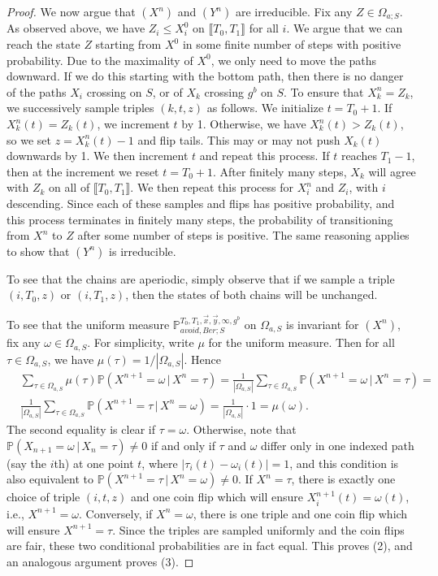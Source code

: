 \begin{proof}
	We now argue that $(X^n)$ and $(Y^n)$ are irreducible. Fix any $Z \in \Omega_{a;S}$. As observed above, we have $Z_i \leq X^0_i$ on $\llbracket T_0,T_1\rrbracket$ for all $i$. We argue that we can reach the state $Z$ starting from $X^0$ in some finite number of steps with positive probability. Due to the maximality of $X^0$, we only need to move the paths downward. If we do this starting with the bottom path, then there is no danger of the paths $X_i$ crossing on $S$, or of $X_k$ crossing $g^b$ on $S$. To ensure that $X^n_k = Z_k$, we successively sample triples $(k,t,z)$ as follows. We initialize $t = T_0 + 1$. If $X_k^n(t) = Z_k(t)$, we increment $t$ by 1. Otherwise, we have $X_k^n(t) > Z_k(t)$, so we set $z = X_k^n(t) - 1$ and flip tails. This may or may not push $X_k(t)$ downwards by 1. We then increment $t$ and repeat this process. If $t$ reaches $T_1 - 1$, then at the increment we reset $t = T_0 + 1$. After finitely many steps, $X_k$ will agree with $Z_k$ on all of $\llbracket T_0, T_1 \rrbracket$. We then repeat this process for $X^n_i$ and $Z_i$, with $i$ descending. Since each of these samples and flips has positive probability, and this process terminates in finitely many steps, the probability of transitioning from $X^n$ to $Z$ after some number of steps is positive. The same reasoning applies to show that $(Y^n)$ is irreducible.
	
	To see that the chains are aperiodic, simply observe that if we sample a triple $(i,T_0,z)$ or $(i,T_1,z)$, then the states of both chains will be unchanged.
	
	To see that the uniform measure $\mathbb{P}_{avoid,Ber;S}^{T_0,T_1,\vec{x},\vec{y},\infty,g^b}$ on $\Omega_{a,S}$ is invariant for $(X^n)$, fix any $\omega\in\Omega_{a,S}$. For simplicity, write $\mu$ for the uniform measure. Then for all $\tau\in\Omega_{a,S}$, we have $\mu(\tau) = 1/|\Omega_{a,S}|$. Hence
	\begin{align*}
	& \sum_{\tau\in\Omega_{a,S}} \mu(\tau)\mathbb{P}(X^{n+1} = \omega\,|\,X^n = \tau) = \frac{1}{|\Omega_{a,S}|}\sum_{\tau\in\Omega_{a,S}} \mathbb{P}(X^{n+1} = \omega\,|\,X^n = \tau) = \\
	& \frac{1}{|\Omega_{a,S}|}\sum_{\tau\in\Omega_{a,S}} \mathbb{P}(X^{n+1} = \tau\,|\,X^n = \omega) = \frac{1}{|\Omega_{a,S}|}\cdot 1 = \mu(\omega).
	\end{align*}
	The second equality is clear if $\tau=\omega$. Otherwise, note that $\mathbb{P}(X_{n+1} = \omega\,|\,X_n = \tau) \neq 0$ if and only if $\tau$ and $\omega$ differ only in one indexed path (say the $i$th) at one point $t$, where $|\tau_i(t)-\omega_i(t)|=1$, and this condition is also equivalent to $\mathbb{P}(X^{n+1} = \tau\,|\,X^n = \omega) \neq 0$. If $X^n=\tau$, there is exactly one choice of triple $(i,t,z)$ and one coin flip which will ensure $X^{n+1}_i(t)=\omega(t)$, i.e., $X^{n+1}=\omega$. Conversely, if $X^n=\omega$, there is one triple and one coin flip which will ensure $X^{n+1}=\tau$. Since the triples are sampled uniformly and the coin flips are fair, these two conditional probabilities are in fact equal. This proves (2), and an analogous argument proves (3).
	

\end{proof}
